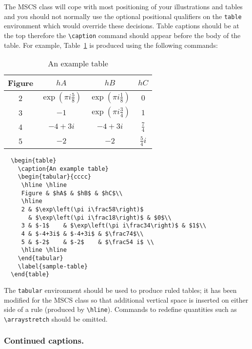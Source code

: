 \documentclass{mscs}
\begin{document}
The MSCS class will cope with most positioning of your illustrations and
tables and you should not normally use the optional positional qualifiers
on the \verb"table" environment which would override these decisions.
Table captions should be at the top therefore the \verb"\caption" command
should appear before the body of the table.
For example, Table~\ref{sample-table} is produced using the following
commands:
%
\begin{table}
  \caption{An example table}
    \begin{tabular}{cccc}
     \hline
     \hline
     Figure & $hA$ & $hB$ & $hC$\\
     \hline
     2 & $\exp\left(\pi i\frac58\right)$
       & $\exp\left(\pi i\frac18\right)$ & $0$\\
     3 & $-1$    & $\exp\left(\pi i\frac34\right)$ & $1$\\
     4 & $-4+3i$ & $-4+3i$ & $\frac74$\\
     5 & $-2$    & $-2$    & $\frac54 i$ \\
     \hline
     \hline
    \end{tabular}
  \label{sample-table}
\end{table}
\begin{verbatim}
  \begin{table}
    \caption{An example table}
    \begin{tabular}{cccc}
     \hline \hline
     Figure & $hA$ & $hB$ & $hC$\\
     \hline
     2 & $\exp\left(\pi i\frac58\right)$
       & $\exp\left(\pi i\frac18\right)$ & $0$\\
     3 & $-1$    & $\exp\left(\pi i\frac34\right)$ & $1$\\
     4 & $-4+3i$ & $-4+3i$ & $\frac74$\\
     5 & $-2$    & $-2$    & $\frac54 i$ \\
     \hline \hline
    \end{tabular}
    \label{sample-table}
  \end{table}
\end{verbatim}
%
The \verb"tabular" environment should be used to produce ruled tables;
it has been modified for the MSCS class so that additional vertical space
is inserted on either side of a rule (produced by \verb"\hline"). Commands
to redefine quantities such as \verb"\arraystretch" should be omitted.

\subsubsection{Continued captions.}
\end{document}
